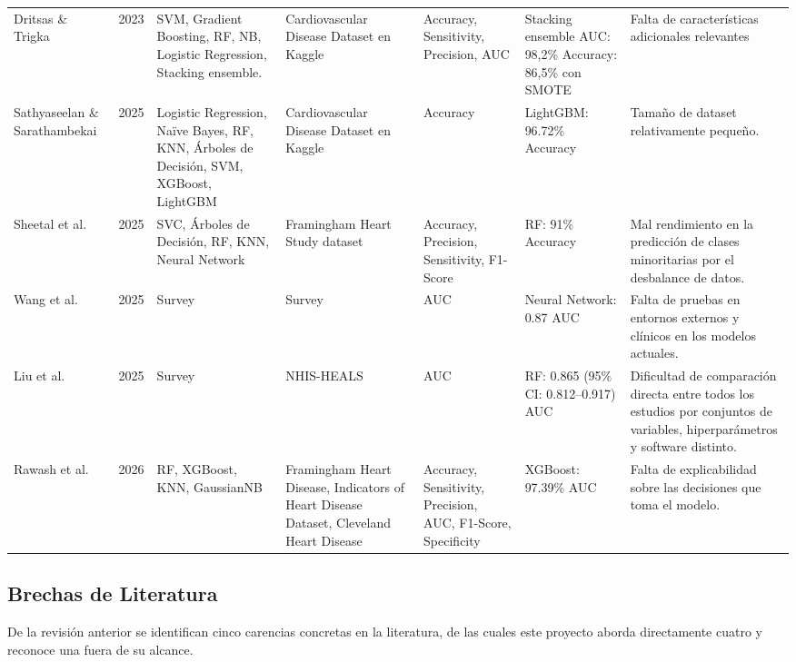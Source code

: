 \documentclass[conference]{IEEEtran}
\begin{document}
\begin{table}[t]
\begin{tabular}{@{}p{1.5cm}p{0.5cm}p{2.8cm}p{2.4cm}p{2.0cm}p{2.3cm}p{3.0cm}@{}}
Dritsas \& Trigka \cite{dritsas2023efficient} & 2023 & SVM, Gradient Boosting, RF, NB, Logistic Regression, Stacking ensemble. & Cardiovascular Disease Dataset en Kaggle & Accuracy, Sensitivity, Precision, AUC & Stacking ensemble AUC: 98,2\% Accuracy: 86,5\% con SMOTE & Falta de características adicionales relevantes \\
Sathyaseelan \& Sarathambekai \cite{sathyaseelan2025comparative} & 2025 & Logistic Regression, Naïve Bayes, RF, KNN, Árboles de Decisión, SVM, XGBoost, LightGBM & Cardiovascular Disease Dataset en Kaggle & Accuracy & LightGBM: 96.72\% Accuracy & Tamaño de dataset relativamente pequeño. \\
Sheetal et al. \cite{sheetal2026evaluating} & 2025 & SVC, Árboles de Decisión, RF, KNN, Neural Network & Framingham Heart Study dataset & Accuracy, Precision, Sensitivity, F1-Score & RF: 91\% Accuracy & Mal rendimiento en la predicción de clases minoritarias por el desbalance de datos. \\
Wang et al. \cite{wang2025machine} & 2025 & Survey & Survey & AUC & Neural Network: 0.87 AUC & Falta de pruebas en entornos externos y clínicos en los modelos actuales. \\
Liu et al. \cite{liu2025machine} & 2025 & Survey & NHIS-HEALS & AUC & RF: 0.865 (95\% CI: 0.812–0.917) AUC & Dificultad de comparación directa entre todos los estudios por conjuntos de variables, hiperparámetros y software distinto. \\
Rawash et al. \cite{rawash2026study} & 2026 & RF, XGBoost, KNN, GaussianNB & Framingham Heart Disease, Indicators of Heart Disease Dataset, Cleveland Heart Disease & Accuracy, Sensitivity, Precision, AUC, F1-Score, Specificity & XGBoost: 97.39\% AUC & Falta de explicabilidad sobre las decisiones que toma el modelo. \\

\bottomrule
\end{tabular}

\end{table}

\FloatBarrier

\subsection{Brechas de Literatura}

De la revisión anterior se identifican cinco carencias concretas en la literatura, de las cuales este proyecto aborda directamente cuatro y reconoce una fuera de su alcance.
\end{document}
